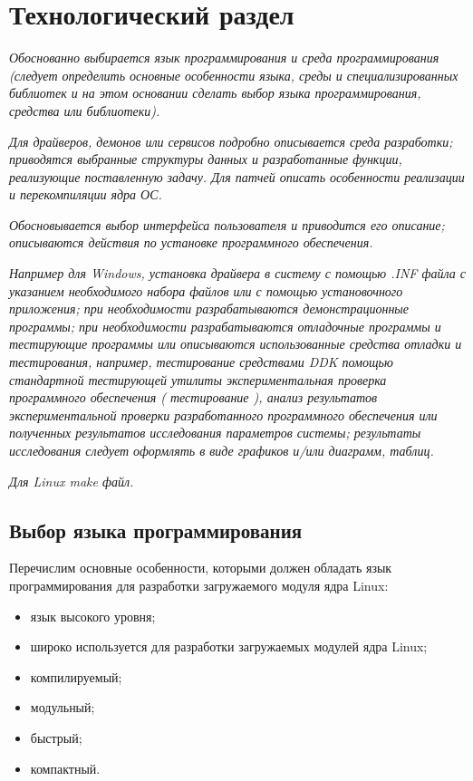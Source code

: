 \chapter{Технологический раздел}

\textit{Обоснованно выбирается язык программирования и среда программирования (следует определить основные особенности языка, среды и специализированных библиотек и на этом основании сделать выбор языка программирования, средства или библиотеки).}

\textit{Для драйверов, демонов или сервисов подробно описывается среда разработки; приводятся выбранные структуры данных и разработанные функции, реализующие поставленную задачу.
Для патчей описать особенности реализации и перекомпиляции ядра ОС.}

\textit{Обосновывается выбор интерфейса пользователя и приводится его описание; описываются действия по установке программного обеспечения.}

\textit{Например для Windows, установка драйвера в систему с помощью .INF файла с указанием необходимого набора файлов или с помощью установочного приложения; при необходимости разрабатываются демонстрационные программы; при необходимости разрабатываются отладочные программы и тестирующие программы или описываются использованные средства отладки и тестирования, например, тестирование средствами DDK помощью стандартной тестирующей утилиты экспериментальная проверка программного обеспечения ( тестирование ), анализ результатов экспериментальной проверки разработанного программного обеспечения или полученных результатов исследования параметров системы; результаты исследования следует оформлять в виде графиков и/или диаграмм, таблиц.}

\textit{Для Linux make файл.}

\section{Выбор языка программирования}

Перечислим основные особенности, которыми должен обладать язык программирования для разработки загружаемого модуля ядра Linux:
\begin{itemize}
	\item язык высокого уровня;
	\item широко используется для разработки загружаемых модулей ядра Linux;
	\item компилируемый;
	\item модульный;
	\item быстрый;
	\item компактный.
\end{itemize}

